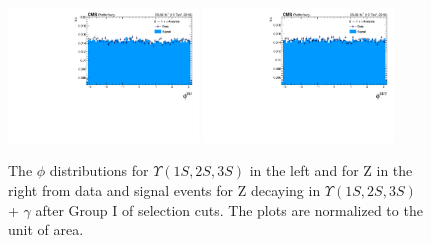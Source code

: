 \begin{figure}[!htbp]
\begin{center}
\includegraphics[width=0.45\textwidth]{figures/outputPlots/ZtoUpsilon_Cat0_ZZZZZ/au/data_x_mc/noKinCuts/h_noKin_Upsilon_phi}\hspace*{1.cm}
\includegraphics[width=0.45\textwidth]{figures/outputPlots/ZtoUpsilon_Cat0_ZZZZZ/au/data_x_mc/noKinCuts/h_noKin_Z_phi}
\end{center}\vspace*{-.5cm}
\caption{The $\phi$ distributions for $\Upsilon(1S,2S,3S)$ in the left and for Z in the right from data and signal events for Z decaying in $\Upsilon(1S,2S,3S)$ + $\gamma$ after Group I of selection cuts. The plots are normalized to the unit of area.}
\label{fig:phiUpsilon_and_Z_ZtoUpsilon_Cat0}
\end{figure}


